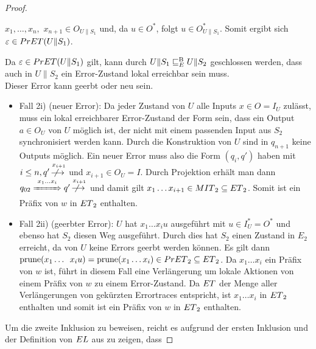 \begin{proof}
\begin{itemize}
\begin{itemize}
          $x_1,\dots ,x_n,$ $x_{n+1}\in O_{U\|S_1}$ und, da $u\in O^*$, folgt
          $u\in O_{U\|S_1}^*$. Somit ergibt sich $\varepsilon\in
          PrET{}(U\|S_1)$.
      \end{itemize}
      Da $\varepsilon\in PrET{}(U\|S_1)$ gilt, kann durch
      $U\|S_1\sqsubseteq _E^\mathrm{B} U\|S_2$ geschlossen werden, dass auch in $U\|S_2$ ein
      Error-Zustand lokal erreichbar sein muss.\\
      Dieser Error kann geerbt oder neu sein.
      \begin{itemize}
        \item Fall 2i) (neuer Error): Da jeder Zustand von $U$ alle Inputs $x\in
          O=I_U$ zulässt, muss ein lokal erreichbarer Error-Zustand der Form sein, dass
          ein Output $a\in O_U$ von $U$ möglich ist, der nicht mit einem
          passenden Input aus $S_2$ synchronisiert werden kann. Durch die
          Konstruktion von $U$ sind in $q_{n+1}$ keine Outputs möglich. Ein
          neuer Error muss also die Form $(q_i,q')$ haben mit $i\leq n, q'
          \overset{x_{i+1}}{\not{\hspace{-0.2cm}\longrightarrow}}$ und $x_{i+1}\in
          O_U=I$. Durch Projektion erhält man dann $q_{02} \overset{x_1\dots
          x_i}{\xRightarrow{\hspace{0.9cm}}} q'
          \overset{x_{i+1}}{\not{\hspace{-0.2cm}\longrightarrow}}$ und damit gilt
          $x_1\dots x_{i+1}\in MIT{}_2\subseteq ET{}_2$. Somit ist ein Präfix
          von $w$ in $ET{}_2$ enthalten.
        \item Fall 2ii) (geerbter Error): $U$ hat $x_1\dots x_i u$ ausgeführt
          mit $u\in I_U^*=O^*$ und ebenso hat $S_2$ diesen Weg ausgeführt.
          Durch dies hat $S_2$ einen Zustand in $E_2$ erreicht, da von $U$
          keine Errors geerbt werden können. Es gilt dann $\mathrm{prune}{}(x_1\dots$
          $x_iu)=\mathrm{prune}{}(x_1\dots x_i)\in PrET{}_2\subseteq ET{}_2$. Da
          $x_1\dots x_i$ ein Präfix von $w$ ist, führt in diesem
          Fall eine Verlängerung um lokale Aktionen von einem
          Präfix von $w$ zu einem Error-Zustand. Da $ET$ der Menge aller
          Verlängerungen von gekürzten Errortraces entspricht, ist $x_1\dots x_i$ in
          $ET{}_2$ enthalten und somit ist ein Präfix von $w$ in $ET{}_2$
          enthalten.
      \end{itemize}
  \end{itemize}
  Um die zweite Inklusion zu beweisen, reicht es aufgrund der ersten
  Inklusion und der Definition von $EL{}$ aus zu zeigen, dass

\end{proof}
